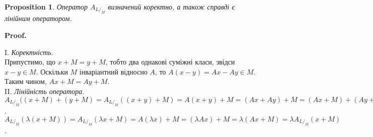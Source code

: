 \documentclass[a4paper, 10pt]{article}
\makeatletter
\theoremstyle{theoremdd}
\newtheorem{proposition}[theorem]{Proposition}
\renewenvironment{proof}[1][Proof.\\]{\par
\pushQED{\hfill \qed}%
\normalfont \topsep6\p@\@plus6\p@\relax
\trivlist
\item\relax
{\bfseries
#1\@addpunct{.}}\hspace\labelsep\ignorespaces
}{%
\popQED\endtrivlist\@endpefalse
}
\makeatother
\begin{document}
\begin{proposition}
Оператор $A_{L/_M}$ визначений коректно, а також справді є лінійним оператором.
\end{proposition}

\begin{proof}
I. \textit{Коректність.}\\
Припустимо, що $x+M = y+M$, тобто два однакові суміжні класи, звідси $x-y \in M$. Оскільки $M$ інваріантний відносно $A$, то $A(x-y) = Ax - Ay \in M$. Таким чином, $Ax + M = Ay + M$.
\bigskip \\
II. \textit{Лінійність оператора.}\\
$A_{L/_M}((x+M) + (y+M) = A_{L/_M}((x+y) + M) = A(x+y) + M = (Ax + Ay) + M = (Ax + M) + (Ay + M) = A_{L/_M}(x+M) + A_{L/_M}(y+M)$.\\
$A_{L/_M}(\lambda(x+M)) = A_{L/_M}( \lambda x + M) = A(\lambda x) + M = (\lambda Ax) + M = \lambda (Ax + M) = \lambda A_{L/_M}(x+M)$.
\end{proof}
\end{document}
